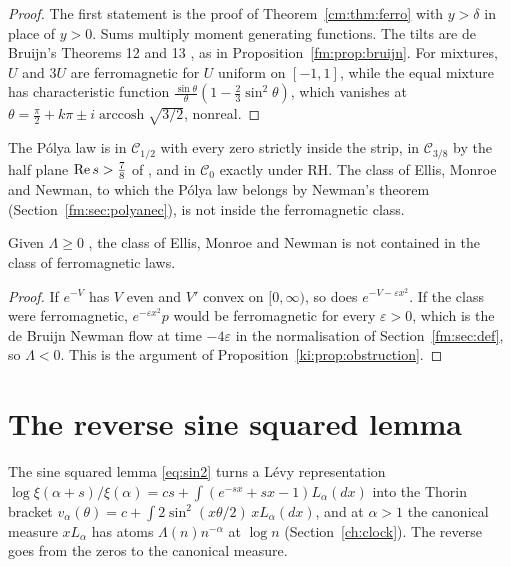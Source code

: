 \begin{proof}
The first statement is the proof of Theorem~\ref{cm:thm:ferro} with $y>\delta$ in place of $y>0$. Sums multiply moment generating functions. The tilts are de Bruijn's Theorems 12 and 13 \cite{deBruijn}, as in Proposition~\ref{fm:prop:bruijn}. For mixtures, $U$ and $3U$ are ferromagnetic for $U$ uniform on $[-1,1]$, while the equal mixture has characteristic function $\frac{\sin\theta}\theta(1-\frac23\sin^2\theta)$, which vanishes at $\theta=\frac\pi2+k\pi\pm i\operatorname{arccosh}\sqrt{3/2}$, nonreal.
\end{proof}

The P\'olya law is in $\mathcal C_{1/2}$ with every zero strictly inside the strip, in $\mathcal C_{3/8}$ by the half plane $\operatorname{Re} s>\frac78$ of \cite{OAI26a}, and in $\mathcal C_0$ exactly under RH. The class of Ellis, Monroe and Newman, to which the P\'olya law belongs by Newman's theorem (Section~\ref{fm:sec:polyanec}), is not inside the ferromagnetic class.

\begin{corollary}\label{cm:cor:emn}
Given $\Lambda\ge0$ \cite{RodgersTao}, the class of Ellis, Monroe and Newman is not contained in the class of ferromagnetic laws.
\end{corollary}

\begin{proof}
If $e^{-V}$ has $V$ even and $V'$ convex on $[0,\infty)$, so does $e^{-V-\varepsilon x^2}$. If the class were ferromagnetic, $e^{-\varepsilon x^2}p$ would be ferromagnetic for every $\varepsilon>0$, which is the de Bruijn Newman flow at time $-4\varepsilon$ in the normalisation of Section~\ref{fm:sec:def}, so $\Lambda<0$. This is the argument of Proposition~\ref{ki:prop:obstruction}.
\end{proof}

\section{The reverse sine squared lemma}\label{cm:sec:reverse}

The sine squared lemma \eqref{eq:sin2} turns a L\'evy representation $\log\xi(\alpha+s)/\xi(\alpha)=cs+\int(e^{-sx}+sx-1)L_\alpha(dx)$ into the Thorin bracket $v_\alpha(\theta)=c+\int2\sin^2(x\theta/2)\,xL_\alpha(dx)$, and at $\alpha>1$ the canonical measure $xL_\alpha$ has atoms $\Lambda(n)n^{-\alpha}$ at $\log n$ (Section~\ref{ch:clock}). The reverse goes from the zeros to the canonical measure.


